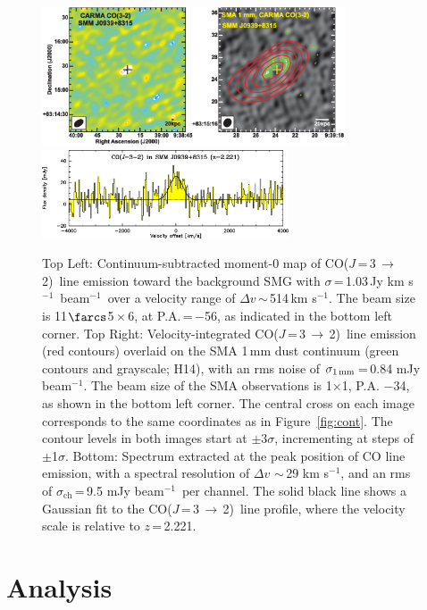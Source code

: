 \documentclass[twocolumn,apj,numberedappendix]{emulateapj}
\newcommand{\CO}{\mbox{CO($J$\,=\,3\,$\rightarrow$\,2) }}
\newcommand{\pmOne}{\mbox{$^{-1}$}}
\begin{document}
\begin{figure}[tbph]
\centering
\includegraphics[width=0.8\textwidth]{Figure/LinePanel_cmyk.eps}
\includegraphics[width=0.65\textwidth]{Figure/smmj0939-co32_spec.eps}
\caption{Top Left: Continuum-subtracted moment-0 map of \CO line emission toward
the background SMG with $\sigma$\,=\,1.03\,Jy\,\,km\,\,s\pmOne\ beam\pmOne\ over a velocity range of $\Delta v$\,$\sim$\,514\,km\,\,s\pmOne. The beam size is 11$\farcs$5\,$\times$\,6, at P.A.\,=\,$-$56\degr, as indicated in the bottom left corner.
Top Right: Velocity-integrated \CO line emission (red contours) overlaid on the SMA 1\,mm dust continuum (green contours and grayscale; H14), with an rms noise of $\sigma_\textrm{1\,mm}$\,=\,0.84 mJy beam\pmOne. The beam size of the SMA observations is 1$ \times $1, P.A. $-$34\degr, as shown
in the bottom left corner.
The central cross on each image corresponds to the same coordinates as in Figure~\ref{fig:cont}. The contour levels 
in both images
start at $\pm$3$\sigma$, incrementing at
steps of $\pm$1$\sigma$.
Bottom:
Spectrum extracted at the peak position of CO line emission, with a spectral resolution of $\Delta v$ $\sim$\,29 km\,\,s\pmOne, and an rms of $\sigma_\textrm{ch}$\,=\,9.5 mJy beam\pmOne\ per channel. The
solid black line shows a Gaussian fit to the \CO line profile, where the velocity scale is relative to $z$\,=\,2.221.
\label{fig:mom0}}
\end{figure}


\section{Analysis}
\end{document}
